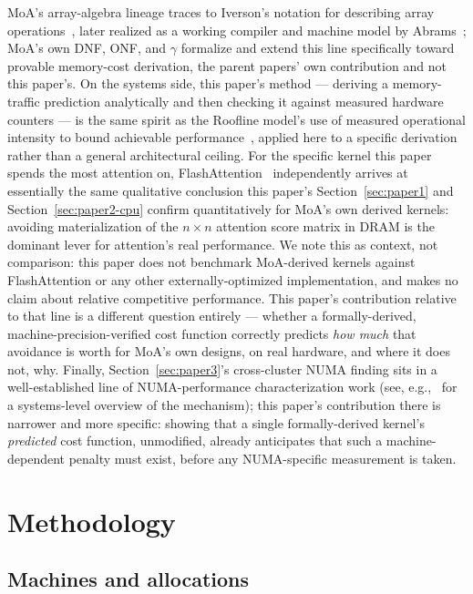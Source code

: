 \documentclass[11pt]{article}
\begin{document}
MoA's array-algebra lineage traces to Iverson's notation for describing
array operations~\cite{iverson1962}, later realized as a working
compiler and machine model by Abrams~\cite{abrams1970}; MoA's own DNF,
ONF, and $\gamma$ formalize and extend this line specifically toward
provable memory-cost derivation, the parent papers' own contribution
and not this paper's. On the systems side, this paper's method ---
deriving a memory-traffic prediction analytically and then checking it
against measured hardware counters --- is the same spirit as the
Roofline model's use of measured operational intensity to bound
achievable performance~\cite{williams2009}, applied here to a specific
derivation rather than a general architectural ceiling. For the
specific kernel this paper spends the most attention on,
FlashAttention~\cite{dao2022} independently arrives at essentially the
same qualitative conclusion this paper's Section~\ref{sec:paper1} and
Section~\ref{sec:paper2-cpu} confirm quantitatively for MoA's own
derived kernels: avoiding materialization of the $n\times n$ attention
score matrix in DRAM is the dominant lever for attention's real
performance. We note this as context, not comparison: this paper does
not benchmark MoA-derived kernels against FlashAttention or any other
externally-optimized implementation, and makes no claim about relative
competitive performance. This paper's contribution relative to that
line is a different question entirely --- whether a formally-derived,
machine-precision-verified cost function correctly predicts \emph{how
much} that avoidance is worth for MoA's own designs, on real hardware,
and where it does not, why. Finally,
Section~\ref{sec:paper3}'s cross-cluster NUMA finding sits in a
well-established line of NUMA-performance characterization work (see,
e.g.,~\cite{lameter2013} for a systems-level overview of the mechanism);
this paper's contribution there is narrower and more specific: showing
that a single formally-derived kernel's \emph{predicted} cost
function, unmodified, already anticipates that such a machine-dependent
penalty must exist, before any NUMA-specific measurement is taken.

\section{Methodology}
\label{sec:methodology}

\subsection{Machines and allocations}
\end{document}
